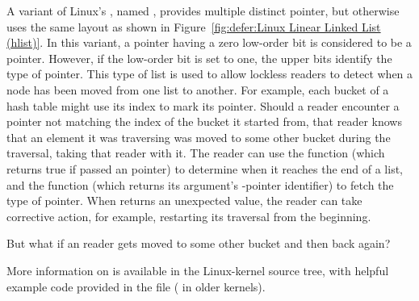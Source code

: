 A variant of Linux's , named , provides multiple
distinct  pointer, but otherwise uses the same layout as shown in
Figure~\ref{fig:defer:Linux Linear Linked List (hlist)}.
In this variant, a  pointer having a zero low-order bit is
considered to be a pointer.
However, if the low-order bit is set to one, the upper bits identify
the type of  pointer.
This type of list is used to allow lockless readers to detect when a
node has been moved from one list to another.
For example, each bucket of a hash table might use its index to mark
its  pointer.
Should a reader encounter a  pointer not matching the index of
the bucket it started from, that reader knows that an element it was
traversing was moved to some other bucket during the traversal, taking
that reader with it.
The reader can use the  function (which returns true
if passed an   pointer) to determine when
it reaches the end of a list, and the  function
(which returns its argument's -pointer identifier) to fetch
the type of  pointer.
When  returns an unexpected value, the reader
can take corrective action, for example, restarting its traversal from
the beginning.

\QuickQuiz{}
	But what if an  reader gets moved to some other
	bucket and then back again?
 \QuickQuizEnd

More information on  is available in the Linux-kernel
source tree, with helpful example code provided in the
 file ( in older kernels).

